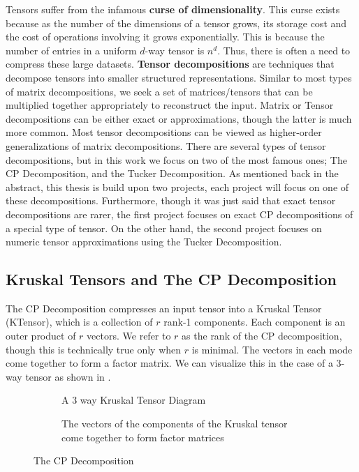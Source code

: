 
Tensors suffer from the infamous \textbf{curse of dimensionality}. This curse
exists because as the number of the dimensions of a tensor grows, its storage
cost and the cost of operations involving it grows exponentially. This is
because the number of entries in a uniform $d$-way tensor is $n^d$. Thus, there
is often a need to compress these large datasets. \textbf{Tensor decompositions}
are techniques that decompose tensors into smaller structured representations.
Similar to most types of matrix decompositions, we seek a set of
matrices/tensors that can be multiplied together appropriately to reconstruct
the input. Matrix or Tensor decompositions can be either exact or
approximations, though the latter is much more common. Most tensor
decompositions can be viewed as higher-order generalizations of matrix
decompositions. There are several types of tensor decompositions, but in this
work we focus on two of the most famous ones; The CP Decomposition, and the
Tucker Decomposition. As mentioned back in the abstract, this thesis is build
upon two projects, each project will focus on one of these decompositions.
Furthermore, though it was just said that exact tensor decompositions are rarer,
the first project focuses on exact CP decompositions of a special type of
tensor. On the other hand, the second project focuses on numeric tensor
approximations using the Tucker Decomposition. 


\subsection{Kruskal Tensors and The CP Decomposition} \label{sec:Kruskal Tensors and The CP Decomposition}
    The CP Decomposition compresses an input tensor into a Kruskal Tensor
    (KTensor), which is a collection of $r$ rank-1 components. Each component is
    an outer product of $r$ vectors. We refer to $r$ as the rank of the CP
    decomposition, though this is technically true only when $r$ is minimal. The
    vectors in each mode come together to form a factor matrix. We can visualize
    this in the case of a 3-way tensor as shown in .
    \begin{figure}[ht!]
        \centering
        \begin{subfigure}[b]{0.99\textwidth}
            \centering
            
            \caption{A 3 way Kruskal Tensor Diagram}
            \label{fig:KTensor}
        \end{subfigure}
        
        \vspace{1em}
        \begin{subfigure}[b]{0.99\textwidth}
            \centering
            
            \caption[Kruskal Tensor Factor Matrices]{The vectors of the components of the Kruskal tensor come together to form factor matrices}
            \label{fig:KTensor_factor_matrices}
        \end{subfigure}
        \caption[The CP Decomposition]{The CP Decomposition}
    \end{figure}

